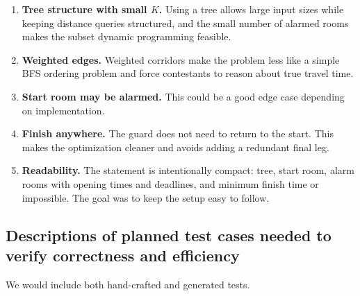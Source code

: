 \documentclass[11pt]{article}
\begin{document}
\begin{enumerate}
    \item \textbf{Tree structure with small $K$.} Using a tree allows large input sizes while keeping distance queries structured, and the small number of alarmed rooms makes the subset dynamic programming feasible.
    
    \item \textbf{Weighted edges.} Weighted corridors make the problem less like a simple BFS ordering problem and force contestants to reason about true travel time.
    
    \item \textbf{Start room may be alarmed.} This could be a good edge case depending on implementation.
    
    \item \textbf{Finish anywhere.} The guard does not need to return to the start. This makes the optimization cleaner and avoids adding a redundant final leg.
        
    \item \textbf{Readability.} The statement is intentionally compact: tree, start room, alarm rooms with opening times and deadlines, and minimum finish time or impossible. The goal was to keep the setup easy to follow.
\end{enumerate}

\subsection*{Descriptions of planned test cases needed to verify correctness and efficiency}
We would include both hand-crafted and generated tests.
\end{document}
